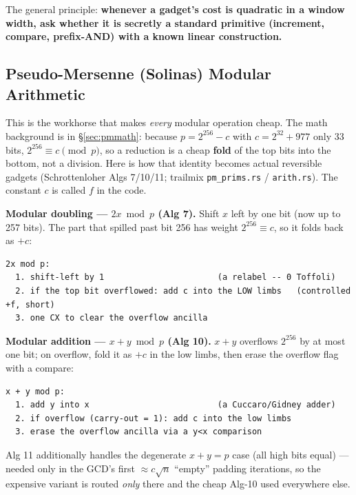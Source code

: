 \documentclass[11pt,a4paper]{article}
\begin{document}
The general principle: \textbf{whenever a gadget's cost is quadratic in a window width, ask whether
it is secretly a standard primitive (increment, compare, prefix-AND) with a known linear
construction.}

\subsection{Pseudo-Mersenne (Solinas) Modular Arithmetic}
\label{sec:pmarith}

This is the workhorse that makes \emph{every} modular operation cheap. The math background is in
\S\ref{sec:pmmath}: because $p = 2^{256} - c$ with $c = 2^{32} + 977$ only 33 bits,
$2^{256} \equiv c \pmod p$, so a reduction is a cheap \textbf{fold} of the top bits into the bottom,
not a division. Here is how that identity becomes actual reversible gadgets (Schrottenloher
Algs 7/10/11; trailmix \lstinline{pm_prims.rs} / \lstinline{arith.rs}). The constant $c$ is called
$f$ in the code.

\textbf{Modular doubling --- $2x \bmod p$ (Alg 7).} Shift $x$ left by one bit (now up to 257 bits).
The part that spilled past bit 256 has weight $2^{256} \equiv c$, so it folds back as $+c$:
\begin{lstlisting}
2x mod p:
  1. shift-left by 1                       (a relabel -- 0 Toffoli)
  2. if the top bit overflowed: add c into the LOW limbs   (controlled +f, short)
  3. one CX to clear the overflow ancilla
\end{lstlisting}

\textbf{Modular addition --- $x + y \bmod p$ (Alg 10).} $x + y$ overflows $2^{256}$ by at most one
bit; on overflow, fold it as $+c$ in the low limbs, then erase the overflow flag with a compare:
\begin{lstlisting}
x + y mod p:
  1. add y into x                          (a Cuccaro/Gidney adder)
  2. if overflow (carry-out = 1): add c into the low limbs
  3. erase the overflow ancilla via a y<x comparison
\end{lstlisting}
Alg 11 additionally handles the degenerate $x + y = p$ case (all high bits equal) --- needed only in
the GCD's first $\approx c\sqrt{n}$ ``empty'' padding iterations, so the expensive variant is routed
\emph{only} there and the cheap Alg-10 used everywhere else.
\end{document}
